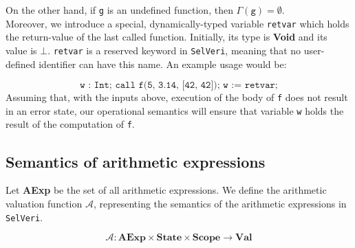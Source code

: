 \documentclass{article}
\begin{document}
On the other hand, if \texttt{g} is an undefined function, then $\Gamma(\texttt{g}) = \emptyset$. \\

Moreover, we introduce a special, dynamically-typed variable \texttt{retvar} which holds the return-value of the last called function. Initially, its type is \textbf{Void} and its value is $\bot$. \texttt{retvar} is a reserved keyword in \texttt{SelVeri}, meaning that no user-defined identifier can have this name.  An example usage would be: 

\[
\texttt{w : Int; call f(5, 3.14, [42, 42]); w := retvar;}
\] Assuming that, with the inputs above, execution of the body of \texttt{f} does not result in an error state, our operational semantics will ensure that variable \texttt{w} holds the result of the computation of \texttt{f}.


\newpage
\subsection{Semantics of arithmetic expressions}

Let \textbf{AExp} be the set of all arithmetic expressions. We define the arithmetic valuation function $\mathcal{A}$, representing the semantics of the arithmetic expressions in \texttt{SelVeri}.

\[
\mathcal{A} : \textbf{AExp} \times \textbf{State} \times \textbf{Scope} \rightarrow \textbf{Val} 
\]
\end{document}
